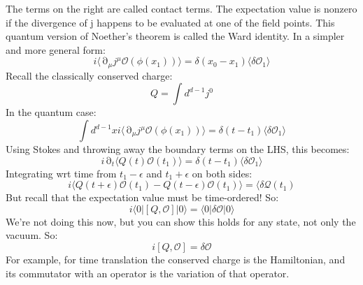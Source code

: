 \documentclass[12 pt]{article}
\DeclareMathOperator {\p} {\partial}
\begin{document}
The terms on the right are called contact terms. The expectation value is nonzero if the divergence of j happens to be evaluated at one of the field points. This quantum version of Noether's theorem is called the Ward identity. In a simpler and more general form:
\[      i \langle \p_{\mu} j^{\mu} \mathcal{O}(\phi(x_1)) \rangle =    \delta (x_0 - x_1)  \langle \delta \mathcal{O}_1 \rangle     \]
Recall the classically conserved charge:
\[        Q = \int d^{d-1} j^0     \]
In the quantum case:
\[        \int d^{d-1} x     i \langle \p_{\mu} j^{\mu} \mathcal{O}(\phi(x_1)) \rangle  =  \delta(t-t_1) \langle \delta \mathcal{O}_1 \rangle          \]
Using Stokes and throwing away the boundary terms on the LHS, this becomes:
\[          i \p_t \langle Q(t) \mathcal{O} (t_1)    \rangle = \delta(t-t_1) \langle \delta \mathcal{O}_1\rangle     \]
Integrating wrt time from $t_1 - \epsilon$ and $t_1 + \epsilon$ on both sides:
\[     i \langle Q(t+\epsilon) \mathcal{O} (t_1) - Q(t-\epsilon) \mathcal{O} (t_1) \rangle = \langle \delta \mathcal{Q} (t_1)    \]
But recall that the expectation value must be time-ordered! So:
\[      i\langle 0 | [ Q ,  \mathcal{O} ] | 0 \rangle = \langle 0 | \delta \mathcal{O} | 0 \rangle      \]
We're not doing this now, but you can show this holds for any state, not only the vacuum. So:
\[        i [Q, \mathcal{O} ] = \delta \mathcal {O}       \]
For example, for time translation the conserved charge is the Hamiltonian, and its commutator with an operator is the variation of that operator.
\end{document}
